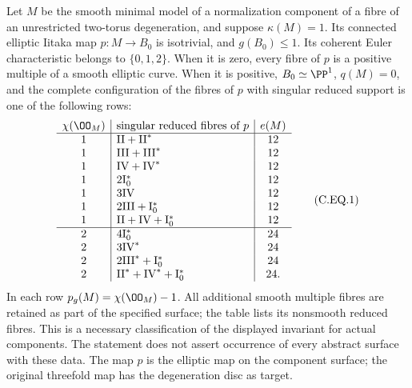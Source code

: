 \begin{proposition}
Let $M$ be the smooth minimal model of a normalization
component of a fibre of an unrestricted two-torus degeneration,
and suppose $\kappa(M)=1$. Its connected elliptic Iitaka map
$p:M\to B_0$ is isotrivial, and $g(B_0)\le1$.
Its coherent Euler characteristic belongs to $\{0,1,2\}$.
When it is zero, every fibre of $p$ is a positive multiple
of a smooth elliptic curve. When it is positive,
$B_0\simeq\PP^1$, $q(M)=0$, and the complete configuration
of the fibres of $p$ with singular reduced support is one
of the following rows:
\[
\begin{array}{c|l|c}
\chi(\OO_M)&\text{singular reduced fibres of }p&e(M)\\ \hline
1&\mathrm{II}+\mathrm{II}^*&12\\
1&\mathrm{III}+\mathrm{III}^*&12\\
1&\mathrm{IV}+\mathrm{IV}^*&12\\
1&2\mathrm I_0^*&12\\
1&3\mathrm{IV}&12\\
1&2\mathrm{III}+\mathrm I_0^*&12\\
1&\mathrm{II}+\mathrm{IV}+\mathrm I_0^*&12\\ \hline
2&4\mathrm I_0^*&24\\
2&3\mathrm{IV}^*&24\\
2&2\mathrm{III}^*+\mathrm I_0^*&24\\
2&\mathrm{II}^*+\mathrm{IV}^*+\mathrm I_0^*&24 .
\end{array}                                                   \tag{C.EQ.1}\label{cdp:eq:C.EQ.1}
\]
In each row $p_g(M)=\chi(\OO_M)-1$. All additional
smooth multiple fibres are retained as part of the specified
surface; the table lists its nonsmooth reduced fibres.
This is a necessary classification of the displayed
invariant for actual components. The statement does not
assert occurrence of every abstract surface with these data.
The map $p$ is the elliptic map on the component surface;
the original threefold map has the degeneration disc as target.
\end{proposition}


